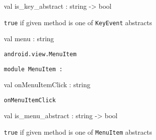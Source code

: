 \documentclass[11pt]{article}
\begin{document}
\begin{ocamldocsigend}
\begin{ocamldocsigend}
\begin{ocamldocdescription}
\end{ocamldocdescription}


\label{val:Android.View.KeyEvent.is-underscorekey-underscoreabstract}\begin{ocamldoccode}
val is_key_abstract : string -> bool
\end{ocamldoccode}
\begin{ocamldocdescription}
{\tt{true}} if given method is one of {\tt{KeyEvent}} abstracts


\end{ocamldocdescription}
\end{ocamldocsigend}




\label{val:Android.View.menu}\begin{ocamldoccode}
val menu : string
\end{ocamldoccode}
\begin{ocamldocdescription}
{\tt{android.view.MenuItem}}


\end{ocamldocdescription}


\begin{ocamldoccode}
{\tt{module }}{\tt{MenuItem}}{\tt{ : }}\end{ocamldoccode}
\label{module:Android.View.MenuItem}
\begin{ocamldocsigend}


\label{val:Android.View.MenuItem.onMenuItemClick}\begin{ocamldoccode}
val onMenuItemClick : string
\end{ocamldoccode}
\begin{ocamldocdescription}
{\tt{onMenuItemClick}}


\end{ocamldocdescription}


\label{val:Android.View.MenuItem.is-underscoremenu-underscoreabstract}\begin{ocamldoccode}
val is_menu_abstract : string -> bool
\end{ocamldoccode}
\begin{ocamldocdescription}
{\tt{true}} if given method is one of {\tt{MenuItem}} abstracts


\end{ocamldocdescription}
\end{ocamldocsigend}





\end{ocamldocsigend}
\end{document}
